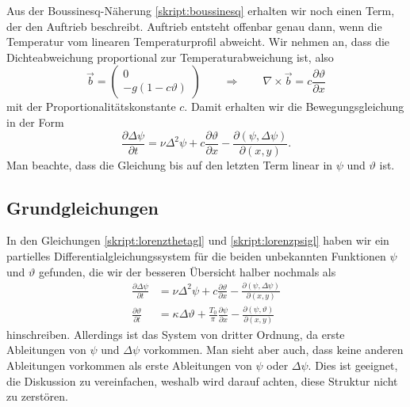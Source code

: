Aus der Boussinesq-Näherung
\eqref{skript:boussinesq}
erhalten wir noch einen Term, der den
Auftrieb beschreibt.
Auftrieb entsteht offenbar genau dann, wenn die Temperatur vom linearen
Temperaturprofil abweicht.
Wir nehmen an, dass die Dichteabweichung proportional zur Temperaturabweichung
ist, also
\[
\vec{b}
=
\begin{pmatrix}
0\\
-g(1-c\vartheta)
\end{pmatrix}
\qquad
\Rightarrow
\qquad
\nabla\times\vec{b}
=
c\frac{\partial\vartheta}{\partial x}
\]
mit der Proportionalitätskonstante $c$.
Damit erhalten wir die Bewegungsgleichung in der Form
\begin{equation}
\frac{\partial\Delta\psi}{\partial t}
=
\nu\Delta^2\psi 
+c\frac{\partial\vartheta}{\partial x}
-\frac{\partial(\psi,\Delta\psi)}{\partial(x,y)}.
\label{skript:lorenzpsigl}
\end{equation}
Man beachte, dass die Gleichung bis auf den letzten Term linear
in $\psi$ und $\vartheta$ ist.

\subsection{Grundgleichungen}
In den Gleichungen
\eqref{skript:lorenzthetagl}
und
\eqref{skript:lorenzpsigl}
haben wir ein partielles Differentialgleichungssystem für die beiden 
unbekannten Funktionen $\psi$ und $\vartheta$ gefunden, die wir
der besseren Übersicht halber nochmals als
\begin{equation}
\begin{aligned}
\frac{\partial\Delta\psi}{\partial t}
&=
\nu\Delta^2\psi 
+c\frac{\partial\vartheta}{\partial x}
-\frac{\partial(\psi,\Delta\psi)}{\partial(x,y)}
\\
\frac{\partial\vartheta}{\partial t}
&=
\kappa\Delta\vartheta
+\frac{T_0}{\pi}\frac{\partial\psi}{\partial x}
-
\frac{\partial(\psi,\vartheta)}{\partial(x,y)}
\end{aligned}
\label{skript:lorenzausgangsgleichung}
\end{equation}
hinschreiben.
Allerdings ist das System von dritter Ordnung, da erste Ableitungen von
$\psi$ und $\Delta\psi$ vorkommen.
Man sieht aber auch, dass keine anderen Ableitungen vorkommen als erste
Ableitungen von $\psi$ oder $\Delta\psi$.
Dies ist geeignet, die Diskussion zu vereinfachen, weshalb wird darauf
achten, diese Struktur nicht zu zerstören.

